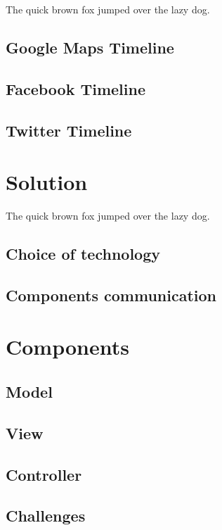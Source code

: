 \documentclass{l4proj}
\begin{document}
The quick brown fox \cite{am97} jumped over the lazy dog.

\section{Google Maps Timeline}

\section{Facebook Timeline}

\section{Twitter Timeline}


\chapter{Solution}
The quick brown fox jumped over the lazy dog.

\section{Choice of technology}

\section{Components communication}

\chapter{Components}

\section{Model}

\section{View}

\section{Controller}

\section{Challenges}
\end{document}
